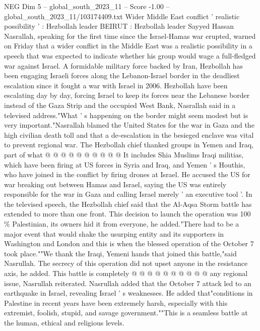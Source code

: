 \begin{textsample}{NEG Dim 5 – global\_south\_2023\_11 – Score -1.00 – global\_south\_2023\_11/103174409.txt}  \label{ex:f5_neg_204}
Wider Middle East conflict ' realistic possibility ' : Hezbollah leader BEIRUT : Hezbollah leader Sayyed Hassan Nasrallah, speaking for the first time since the Israel-Hamas war erupted, warned on Friday that a wider conflict in the Middle East was a realistic possibility in a speech that was expected to indicate whether his group would wage a full-fledged war against Israel.
A formidable military force backed by Iran, Hezbollah has been engaging Israeli forces along the Lebanon-Israel border in the deadliest escalation since it fought a war with Israel in 2006.
Hezbollah have been escalating day by day, forcing Israel to keep its forces near the Lebanese border instead of the Gaza Strip and the occupied West Bank, Nasrallah said in a televised address."What ' s happening on the border might seem modest but is very important."Nasrallah blamed the United States for the war in Gaza and the high civilian death toll and that a de-escalation in the besieged enclave was vital to prevent regional war.
The Hezbollah chief thanked groups in Yemen and Iraq, part of what @ @ @ @ @ @ @ @ @ @ It includes Shia Muslims Iraqi militias, which have been firing at US forces in Syria and Iraq, and Yemen ' s Houthis, who have joined in the conflict by firing drones at Israel.
He accused the US for war breaking out between Hamas and Israel, saying the US was entirely responsible for the war in Gaza and calling Israel merely ' an executive tool '.
In the televised speech, the Hezbollah chief said that the Al-Aqsa Storm battle has extended to more than one front.
This decision to launch the operation was 100 \% Palestinian, its owners hid it from everyone, he added."There had to be a major event that would shake the usurping entity and its supporters in Washington and London and this is when the blessed operation of the October 7 took place.""We thank the Iraqi, Yemeni hands that joined this battle,"said Nasrullah.
The secrecy of this operation did not upset anyone in the resistance axis, he added.
This battle is completely @ @ @ @ @ @ @ @ @ @ any regional issue, Nasrullah reiterated.
Nasrullah added that the October 7 attack led to an earthquake in Israel, revealing Israel ' s weaknesses.
He added that"conditions in Palestine in recent years have been extremely harsh, especially with this extremist, foolish, stupid, and savage government.""This is a seamless battle at the human, ethical and religious levels.

\end{textsample}
